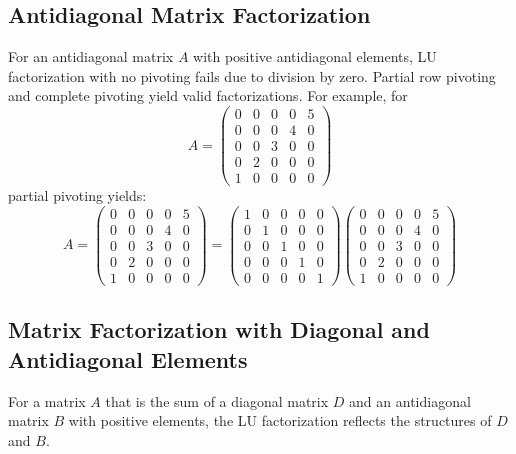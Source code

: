 \documentclass{article}
\begin{document}
\subsection{Antidiagonal Matrix Factorization}
For an antidiagonal matrix \( A \) with positive antidiagonal elements, LU factorization with no pivoting fails due to division by zero. Partial row pivoting and complete pivoting yield valid factorizations. For example, for
\[ A = \begin{pmatrix} 0 & 0 & 0 & 0 & 5 \\ 0 & 0 & 0 & 4 & 0 \\ 0 & 0 & 3 & 0 & 0 \\ 0 & 2 & 0 & 0 & 0 \\ 1 & 0 & 0 & 0 & 0 \end{pmatrix} \]
partial pivoting yields:
\[ A = \begin{pmatrix} 0 & 0 & 0 & 0 & 5 \\ 0 & 0 & 0 & 4 & 0 \\ 0 & 0 & 3 & 0 & 0 \\ 0 & 2 & 0 & 0 & 0 \\ 1 & 0 & 0 & 0 & 0 \end{pmatrix} = \begin{pmatrix} 1 & 0 & 0 & 0 & 0 \\ 0 & 1 & 0 & 0 & 0 \\ 0 & 0 & 1 & 0 & 0 \\ 0 & 0 & 0 & 1 & 0 \\ 0 & 0 & 0 & 0 & 1 \end{pmatrix} \begin{pmatrix} 0 & 0 & 0 & 0 & 5 \\ 0 & 0 & 0 & 4 & 0 \\ 0 & 0 & 3 & 0 & 0 \\ 0 & 2 & 0 & 0 & 0 \\ 1 & 0 & 0 & 0 & 0 \end{pmatrix} \]

\subsection{Matrix Factorization with Diagonal and Antidiagonal Elements}
For a matrix \( A \) that is the sum of a diagonal matrix \( D \) and an antidiagonal matrix \( B \) with positive elements, the LU factorization reflects the structures of \( D \) and \( B \).
\end{document}
